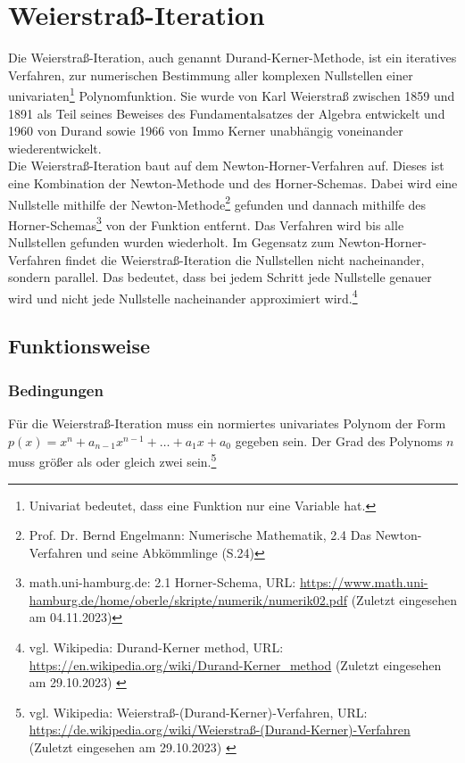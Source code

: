 \documentclass[12pt]{article}
\begin{document}
\section{Weierstraß-Iteration}
Die Weierstraß-Iteration, auch genannt Durand-Kerner-Methode, ist ein iteratives Verfahren, zur numerischen Bestimmung aller komplexen Nullstellen einer univariaten\footnote{Univariat bedeutet, dass eine Funktion nur eine Variable hat.} Polynomfunktion. 
Sie wurde von Karl Weierstraß zwischen 1859 und 1891 als Teil seines Beweises des Fundamentalsatzes der Algebra entwickelt und 1960 von Durand sowie 1966 von Immo Kerner unabhängig voneinander wiederentwickelt.\\
Die Weierstraß-Iteration baut auf dem Newton-Horner-Verfahren auf. Dieses ist eine Kombination der Newton-Methode und des Horner-Schemas. Dabei wird eine Nullstelle mithilfe der Newton-Methode\footnote{
    Prof. Dr. Bernd Engelmann: Numerische Mathematik, 2.4 Das Newton-Verfahren und seine Abkömmlinge (S.24)
} gefunden und dannach mithilfe des Horner-Schemas\footnote{
    math.uni-hamburg.de: 2.1 Horner-Schema, URL: \url{https://www.math.uni-hamburg.de/home/oberle/skripte/numerik/numerik02.pdf} (Zuletzt eingesehen am 04.11.2023)
} von der Funktion entfernt. Das Verfahren wird bis alle Nullstellen gefunden wurden wiederholt.
Im Gegensatz zum Newton-Horner-Verfahren findet die Weierstraß-Iteration die Nullstellen nicht nacheinander, sondern parallel. Das bedeutet, dass bei jedem Schritt jede Nullstelle genauer wird und nicht jede Nullstelle nacheinander approximiert wird.\footnote{
    vgl. Wikipedia: Durand-Kerner method, URL: \url{https://en.wikipedia.org/wiki/Durand-Kerner_method} (Zuletzt eingesehen am 29.10.2023)
    \label{ftn:Wikipedia-Durand-Kerner-Method}
}

\subsection{Funktionsweise}
\subsubsection{Bedingungen}
Für die Weierstraß-Iteration muss ein normiertes univariates Polynom der Form $p(x) = x^n + a_{n-1} x^{n-1} + \dots + a_1 x + a_0$ gegeben sein. Der Grad des Polynoms $n$ muss größer als oder gleich zwei sein.\footnote{
    vgl. Wikipedia: Weierstraß-(Durand-Kerner)-Verfahren, URL: \url{https://de.wikipedia.org/wiki/Weierstraß-(Durand-Kerner)-Verfahren} (Zuletzt eingesehen am 29.10.2023)
    \label{ftn:Wikipedia-Weierstraß-Methode}
}
\end{document}
